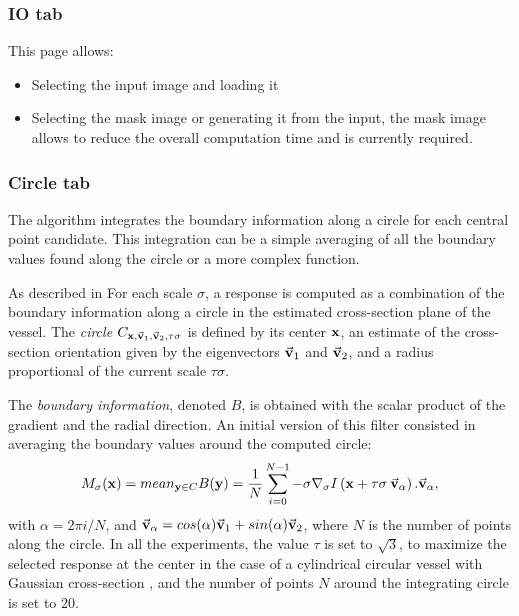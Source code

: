 \documentclass{article}
\newcommand{\vep}[1]  {  \vec{ \bf v}_{#1} }
\newcommand{\Vect}[1] {  \vec{\bf #1 } } %
\begin{document}
\subsubsection{IO tab}
This page allows:
\begin{itemize}
 \item Selecting the input image and loading it
 \item Selecting the mask image or generating it from the input, the mask image allows to reduce the overall computation time and is currently required.
\end{itemize}

\subsubsection{Circle tab}
The algorithm integrates the boundary information along a circle for each central point candidate. This integration can be a simple averaging of all the boundary values found along the circle or a more complex function.

As described in \cite{Krissian2000b,Krissian_al_2003,KA09}
For each scale $\sigma$, a response is computed as a combination of the boundary information
along a circle in the estimated cross-section plane of the vessel.
The {\em circle} $C_{{\bf x},\vep{1},\vep{2},\tau \sigma}$ is defined by its center ${\bf x}$,
an estimate of the cross-section orientation given
by the eigenvectors $\vep{1}$ and $\vep{2}$,
and a radius proportional of the current scale $\tau \sigma$.

The {\em boundary information}, denoted $B$, is obtained with the scalar product of the gradient and the radial direction.
An initial version of this filter consisted in averaging the boundary values around the computed circle:
\begin{equation}\label{eq:RepInt2}
    M_\sigma({\bf x}) = mean_{{\bf y} \in C}  B({\bf y})
    = \frac{1}{N}
    \sum_{i=0}^{N-1} - \sigma \nabla_{\sigma} I \left( {\bf x}+ \tau \sigma\:
    \Vect{v}_\alpha \right) . \Vect{v}_\alpha,
\end{equation}
with $\alpha = 2\pi i/N$,
and $\Vect{v}_\alpha = cos(\alpha) \vep{1} + sin(\alpha) \vep{2}$, where $N$ is the number
of points along the circle.
%
In all the experiments, the value  $\tau$ is set to $\sqrt{3}$, to maximize the selected response at the center in the case of a cylindrical circular vessel with Gaussian cross-section \cite{Krissian2000b},
and the number of points $N$ around the integrating circle is set to $20$.
\end{document}
